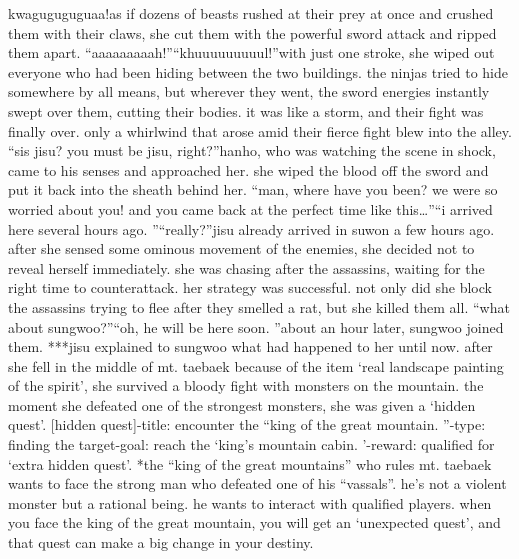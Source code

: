 kwaguguguguaa!as if dozens of beasts rushed at their prey at once and crushed them with their claws, she cut them with the powerful sword attack and ripped them apart.
“aaaaaaaaah!”“khuuuuuuuuul!”with just one stroke, she wiped out everyone who had been hiding between the two buildings.
the ninjas tried to hide somewhere by all means, but wherever they went, the sword energies instantly swept over them, cutting their bodies.
it was like a storm, and their fight was finally over.
only a whirlwind that arose amid their fierce fight blew into the alley.
“sis jisu? you must be jisu, right?”hanho, who was watching the scene in shock, came to his senses and approached her.
she wiped the blood off the sword and put it back into the sheath behind her.
“man, where have you been? we were so worried about you! and you came back at the perfect time like this…”“i arrived here several hours ago.
”“really?”jisu already arrived in suwon a few hours ago.
 after she sensed some ominous movement of the enemies, she decided not to reveal herself immediately.
 she was chasing after the assassins, waiting for the right time to counterattack.
her strategy was successful.
 not only did she block the assassins trying to flee after they smelled a rat, but she killed them all.
“what about sungwoo?”“oh, he will be here soon.
”about an hour later, sungwoo joined them.
***jisu explained to sungwoo what had happened to her until now.
after she fell in the middle of mt.
 taebaek because of the item ‘real landscape painting of the spirit’, she survived a bloody fight with monsters on the mountain.
the moment she defeated one of the strongest monsters, she was given a ‘hidden quest’.
[hidden quest]-title: encounter the “king of the great mountain.
”-type: finding the target-goal: reach the ‘king’s mountain cabin.
’-reward: qualified for ‘extra hidden quest’.
*the “king of the great mountains” who rules mt.
 taebaek wants to face the strong man who defeated one of his “vassals”.
 he’s not a violent monster but a rational being.
 he wants to interact with qualified players.
when you face the king of the great mountain, you will get an ‘unexpected quest’, and that quest can make a big change in your destiny.


